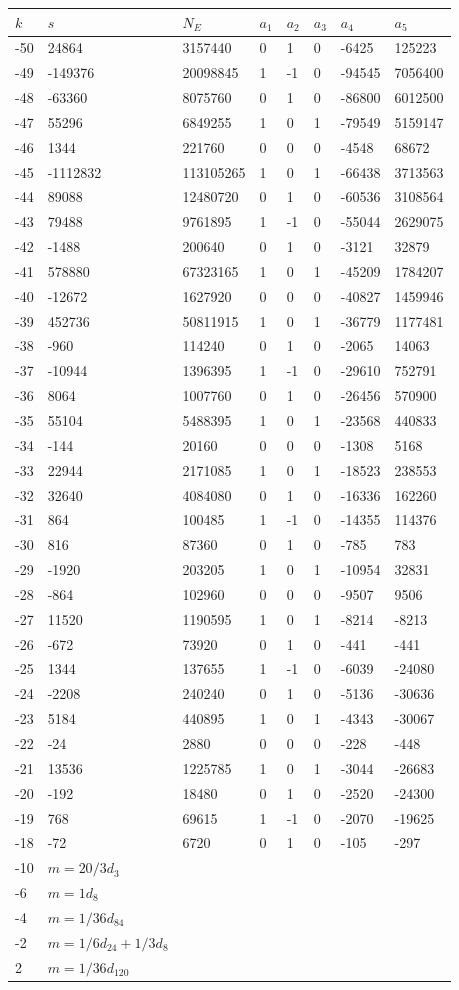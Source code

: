 \documentclass{amsart}
\begin{document}
\begin{longtable}{|l|l|l|lllll|}
\hline
$k$ & $s$ & $N_E$ & $a_1$ & $a_2$ & $a_3$ & $a_4$ & $a_5$\\
\hline
-50&24864&3157440&0&1&0&-6425&125223\\
-49&-149376&20098845&1&-1&0&-94545&7056400\\
-48&-63360&8075760&0&1&0&-86800&6012500\\
-47&55296&6849255&1&0&1&-79549&5159147\\
-46&1344&221760&0&0&0&-4548&68672\\
-45&-1112832&113105265&1&0&1&-66438&3713563\\
-44&89088&12480720&0&1&0&-60536&3108564\\
-43&79488&9761895&1&-1&0&-55044&2629075\\
-42&-1488&200640&0&1&0&-3121&32879\\
-41&578880&67323165&1&0&1&-45209&1784207\\
-40&-12672&1627920&0&0&0&-40827&1459946\\
-39&452736&50811915&1&0&1&-36779&1177481\\
-38&-960&114240&0&1&0&-2065&14063\\
-37&-10944&1396395&1&-1&0&-29610&752791\\
-36&8064&1007760&0&1&0&-26456&570900\\
-35&55104&5488395&1&0&1&-23568&440833\\
-34&-144&20160&0&0&0&-1308&5168\\
-33&22944&2171085&1&0&1&-18523&238553\\
-32&32640&4084080&0&1&0&-16336&162260\\
-31&864&100485&1&-1&0&-14355&114376\\
-30&816&87360&0&1&0&-785&783\\
-29&-1920&203205&1&0&1&-10954&32831\\
-28&-864&102960&0&0&0&-9507&9506\\
-27&11520&1190595&1&0&1&-8214&-8213\\
-26&-672&73920&0&1&0&-441&-441\\
-25&1344&137655&1&-1&0&-6039&-24080\\
-24&-2208&240240&0&1&0&-5136&-30636\\
-23&5184&440895&1&0&1&-4343&-30067\\
-22&-24&2880&0&0&0&-228&-448\\
-21&13536&1225785&1&0&1&-3044&-26683\\
-20&-192&18480&0&1&0&-2520&-24300\\
-19&768&69615&1&-1&0&-2070&-19625\\
-18&-72&6720&0&1&0&-105&-297\\
-10&$m=20/3d_{3}$&&\multicolumn{5}{c|}{}\\
-6&$m=1d_{8}$&&\multicolumn{5}{c|}{}\\
-4&$m=1/36d_{84}$&&\multicolumn{5}{c|}{}\\
-2&$m=1/6d_{24}+1/3d_{8}$&&\multicolumn{5}{c|}{}\\
2&$m=1/36d_{120}$&&\multicolumn{5}{c|}{}\\
\hline
\end{longtable}
\end{document}
